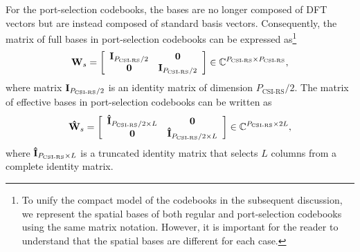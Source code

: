 \documentclass[lettersize,journal]{IEEEtran}
\begin{document}
For the port-selection codebooks, the bases are no longer composed of DFT vectors but are instead composed of standard basis vectors. Consequently, the matrix of full bases in port-selection codebooks can be expressed as\footnote{To unify the compact model of the codebooks in the subsequent discussion, we represent the spatial bases of both regular and port-selection codebooks using the same matrix notation. However, it is important for the reader to understand that the spatial bases are different for each case.}
\begin{equation}\label{b115}
{{\bf{W}}_s} = \left[ {\begin{array}{*{20}{c}}
{{{\bf{I}}_{{P_{{\text{CSI-RS}}}}/2}}}&{\bf{0}}\\
{\bf{0}}&{{{\bf{I}}_{{P_{{\text{CSI-RS}}}}/2}}}
\end{array}} \right]\in {\mathbb{C}}^{{{P_{{\text{CSI-RS}}}}} \times {{P_{{\text{CSI-RS}}}}}},
\end{equation}
where matrix ${{{\bf{I}}_{{P_{{\text{CSI-RS}}}}/2}}}$ is an identity matrix of dimension ${{P_{{\text{CSI-RS}}}}/2}$. The matrix of effective bases in port-selection codebooks can be written as 
\begin{equation}\label{b116}
{{\bf{\hat W}}_s} = \left[ {\begin{array}{*{20}{c}}
{{{{\bf{\hat I}}}_{{P_{{\text{CSI-RS}}}/2} \times L}}}&{\bf{0}}\\
{\bf{0}}&{{{{\bf{\hat I}}}_{{P_{{\text{CSI-RS}}}/2} \times L}}}
\end{array}} \right]\in {\mathbb{C}}^{{{P_{{\text{CSI-RS}}}}} \times {2L}},
\end{equation}
where ${{{{\bf{\hat I}}}_{{P_{{\text{CSI-RS}}}} \times L}}}$ is a truncated identity matrix that selects $L$ columns from a complete identity matrix.
\end{document}
